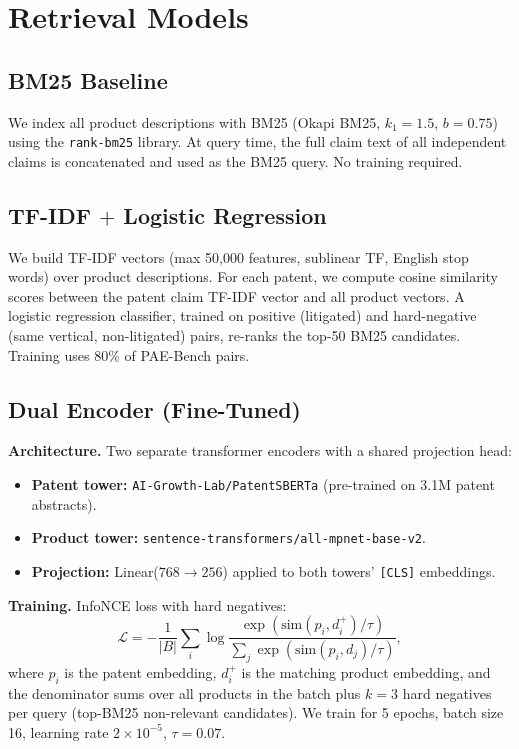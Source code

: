 \documentclass[11pt]{article}
\begin{document}
\section{Retrieval Models}

\subsection{BM25 Baseline}
We index all product descriptions with BM25 (Okapi BM25, $k_1{=}1.5$, $b{=}0.75$) using the \texttt{rank-bm25} library. At query time, the full claim text of all independent claims is concatenated and used as the BM25 query. No training required.

\subsection{TF-IDF $+$ Logistic Regression}
We build TF-IDF vectors (max 50{,}000 features, sublinear TF, English stop words) over product descriptions. For each patent, we compute cosine similarity scores between the patent claim TF-IDF vector and all product vectors. A logistic regression classifier, trained on positive (litigated) and hard-negative (same vertical, non-litigated) pairs, re-ranks the top-50 BM25 candidates. Training uses 80\% of PAE-Bench pairs.

\subsection{Dual Encoder (Fine-Tuned)}

\textbf{Architecture.} Two separate transformer encoders with a shared projection head:
\begin{itemize}[leftmargin=*]
    \item \textbf{Patent tower:} \texttt{AI-Growth-Lab/PatentSBERTa} (pre-trained on 3.1M patent abstracts).
    \item \textbf{Product tower:} \texttt{sentence-transformers/all-mpnet-base-v2}.
    \item \textbf{Projection:} Linear($768 \to 256$) applied to both towers' \texttt{[CLS]} embeddings.
\end{itemize}

\textbf{Training.} InfoNCE loss with hard negatives:
\begin{equation}
\mathcal{L} = -\frac{1}{|B|}\sum_{i} \log \frac{\exp(\mathrm{sim}(p_i, d_i^+)/\tau)}{\sum_{j} \exp(\mathrm{sim}(p_i, d_j)/\tau)},
\end{equation}
where $p_i$ is the patent embedding, $d_i^+$ is the matching product embedding, and the denominator sums over all products in the batch plus $k{=}3$ hard negatives per query (top-BM25 non-relevant candidates). We train for 5 epochs, batch size 16, learning rate $2\times 10^{-5}$, $\tau{=}0.07$.
\end{document}
